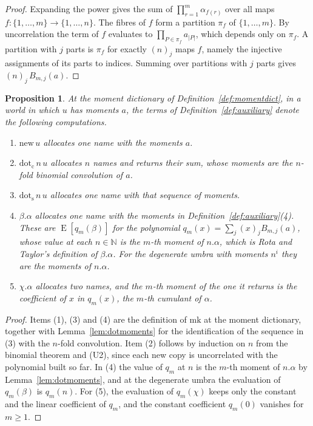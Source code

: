 \documentclass[11pt,a4paper]{report}
\theoremstyle{plain}
\newtheorem{proposition}[theorem]{Proposition}
\theoremstyle{definition}
\theoremstyle{remark}
\newcommand{\E}{\operatorname{E}}
\newcommand{\NN}{\mathbb{N}}
\newcommand{\mk}{\mathrm{mk}}
\begin{document}
\begin{proof}
Expanding the power gives the sum of
$\prod_{r=1}^{m} \alpha_{f(r)}$ over all maps
$f : \{1, \dots, m\} \to \{1, \dots, n\}$. The fibres of $f$ form a partition
$\pi_f$ of $\{1, \dots, m\}$. By uncorrelation the term of $f$ evaluates to
$\prod_{P \in \pi_f} a_{|P|}$, which depends only on $\pi_f$. A partition
with $j$ parts is $\pi_f$ for exactly $(n)_j$ maps $f$, namely the injective
assignments of its parts to indices. Summing over partitions with $j$ parts
gives $(n)_j\, B_{m,j}(a)$.
\end{proof}

\begin{proposition}
\label{prop:auxiliary}
At the moment dictionary of Definition~\ref{def:momentdict}, in a world in which
$u$ has moments $a$, the terms of Definition~\ref{def:auxiliary} denote the
following computations.
\begin{enumerate}
\item $\mathrm{new}\,u$ allocates one name with the moments $a$.
\item $\mathrm{dot}_{\mathrm{c}}\,n\,u$ allocates $n$ names and returns their
  sum, whose moments are the $n$-fold binomial convolution of $a$.
\item $\mathrm{dot}_{\mathrm{s}}\,n\,u$ allocates one name with that sequence of
  moments.
\item $\beta.\alpha$ allocates one name with the moments in
  Definition~\ref{def:auxiliary}(4). These are $\E[q_m(\beta)]$ for the
  polynomial $q_m(x) = \sum_j (x)_j B_{m,j}(a)$, whose value at each $n \in \NN$ is
  the $m$-th moment of $n.\alpha$, which is Rota and Taylor's definition of
  $\beta.\alpha$. For the degenerate umbra with moments $n^i$ they are the moments
  of $n.\alpha$.
\item $\chi.\alpha$ allocates two names, and the $m$-th moment of the one it
  returns is the coefficient of $x$ in $q_m(x)$, the $m$-th cumulant of
  $\alpha$.
\end{enumerate}
\end{proposition}

\begin{proof}
Items (1), (3) and (4) are the definition of $\mk$ at the moment dictionary,
together with Lemma~\ref{lem:dotmoments} for the identification of the sequence
in (3) with the $n$-fold convolution. Item (2) follows by induction on $n$ from
the binomial theorem and (U2), since each new copy is uncorrelated with the
polynomial built so far. In (4) the value of $q_m$ at $n$
is the $m$-th moment of $n.\alpha$ by Lemma~\ref{lem:dotmoments}, and at the
degenerate umbra the evaluation of $q_m(\beta)$ is $q_m(n)$. For (5), the
evaluation of $q_m(\chi)$ keeps only the constant and the linear coefficient of
$q_m$, and the constant coefficient $q_m(0)$ vanishes for $m \geq 1$.
\end{proof}
\end{document}
